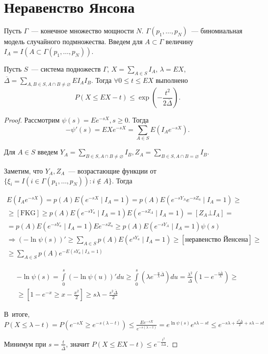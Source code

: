 \documentclass{article}
\begin{document}
\section{Неравенство Янсона}

Пусть $\Gamma$~--- конечное множество мощности $N$. $\Gamma(p_1, \ldots, p_N)$~--- биномиальная
модель случайного подмножества. Введем для $A \subset \Gamma$ величину $I_A = I(A \subset
\Gamma(p_1, \ldots, p_N))$.

\begin{theorem}
	Пусть $S$~--- система подножеств $\Gamma$, $X = \sum\limits_{A \in S} I_A$, $\lambda = EX$,
	$\overline{\Delta} = \sum\limits_{A,B\in S, A\cap B\ne\varnothing} EI_A I_B$. Тогда $\forall 0 \le
	t \le EX$ выполнено
	$$ P(X \le EX - t) \le \exp\left(-\frac{t^2}{2\overline{\Delta}}\right).$$
\end{theorem}
\begin{proof}
	Рассмотрим $\psi(s) = Ee^{-sX}, s \ge 0$. Тогда
	$$-\psi'(s) = EXe^{-sX} = \sum\limits_{A \in S} E(I_A e^{-sX}).$$

	Для $A \in S$ введем $Y_A = \sum\limits_{B \in S, A \cap B \ne \varnothing} I_B, Z_A =
	\sum\limits_{B \in S, A \cap B = \varnothing} I_B$.

	Заметим, что $Y_A, Z_A$~--- возрастающие функции от $\{\xi_i = I(i \in \Gamma(p_1, \ldots, p_N)):
	i \notin A \}$. Тогда

	\begin{multline*}
		E(I_A e^{-sX}) = p(A) E(e^{-sX} \mid I_A = 1) = p(A) E(e^{-sY_A} e^{-sZ_a} \mid I_A = 1) \ge\\
		\ge [\text{FKG}] \ge p(A) E(e^{-sY_a} \mid I_A = 1) E(e^{-sZ_A} \mid I_A = 1) = [Z_A \bot I_A] =
		\\ = p(A) E(e^{-sY_a} \mid I_A = 1) Ee^{-sZ_a} \ge p(A) E(e^{-sY_A} \mid I_A = 1) \psi(s)
		\\ \Rightarrow  (-\ln \psi(s))' \ge \sum\limits_{A \in S} p(A) E(e^{sY_a} \mid I_A = 1) \ge
		[\text{неравенство Йенсена}] \ge\\\ge \sum\limits_{A \in S} p(A) e^{-E(sY_a \mid I_A = 1)}
	\end{multline*}

	\begin{multline*}
		-\ln \psi(s) = \int\limits_0^s (-\ln \psi(u))' du \ge \int\limits_0^s (\lambda
		e^{-\frac{u}{\lambda}\overline{\Delta}}) du = \frac{\lambda^2}{\overline{\Delta}}(1 -
		e^{-\frac{s\overline{\Delta}}{\lambda}}) \ge\\\ge [1 - e^{-x} \ge x - \frac{x^2}{2}]  \ge
		s\lambda - \frac{s^2\overline{\Delta}}{2}
	\end{multline*}

	В~итоге, $P(X \le \lambda - t) = P(e^{-sX} \ge e^{-s(\lambda - t)}) \le
	\frac{Ee^{-sX}}{e^{-s(\lambda - t)}} = e^{\ln\psi(s)} e^{s\lambda - st} \le e^{-s\lambda +
	\frac{s^2\overline{\Delta}}{2} + s\lambda - st}$

	Минимум при $s = \frac{t}{\overline{\Delta}}$, значит $P(X \le EX - t) \le
	e^{-\frac{t^2}{2\overline{\Delta}}}$.
\end{proof}
\end{document}
